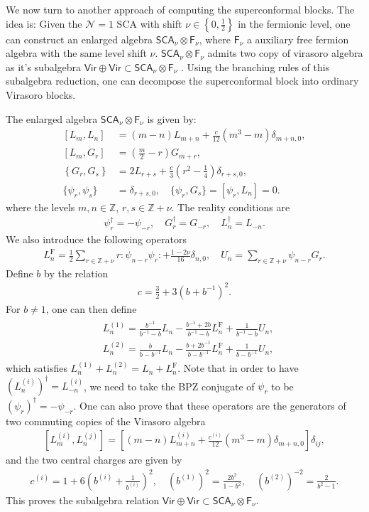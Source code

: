 \documentclass[12pt]{article}
\newcommand{\ie}{\begin{equation}\begin{aligned}}
\newcommand{\fe}{\end{aligned}\end{equation}}
\numberwithin{equation}{section}
\begin{document}
We now turn to another approach of computing the superconformal blocks. The idea is: Given the $\mathcal{N}=1$ SCA with shift $\nu\in \left\{0,\frac{1}{2}\right\}$ in the fermionic level, one can construct an enlarged algebra $\mathsf{SCA}_\nu \otimes \mathsf{F}_{\nu}$, where $\mathsf{F}_{\nu}$ a auxiliary free fermion algebra with the same level shift $\nu$.  $\mathsf{SCA}_\nu \otimes \mathsf{F}_{\nu}$ admits two copy of virasoro algebra as it's subalgebra $\mathsf{Vir}\oplus \mathsf{Vir}\subset \mathsf{SCA}_\nu \otimes \mathsf{F}_{\nu}$ \cite{1312.4520,1608.02568}. Using the branching rules of this subalgebra reduction, one can decompose the superconformal block into ordinary Virasoro blocks.

The enlarged algebra $\mathsf{SCA}_\nu \otimes \mathsf{F}_{\nu}$ is given by:
\ie
{\left[L_m, L_n\right] } & =(m-n) L_{m+n}+\frac{c}{12}\left(m^3-m\right) \delta_{m+n, 0}, \\
{\left[L_m, G_r\right] } & =\left(\frac{m}{2}-r\right) G_{m+r}, \\
\left\{G_r, G_s\right\} & =2 L_{r+s}+\frac{c}{3}\left(r^2-\frac{1}{4}\right) \delta_{r+s, 0} ,\\
\{\psi_r, \psi_s\} &= \delta_{r+s,0},\quad \{\psi_r, G_s\}=[\psi_r, L_n] = 0.
\fe
where the levels $m,n\in\mathbb{Z}$, $r, s\in \mathbb{Z}+\nu$. The reality conditions are
\ie
\psi_{r}^\dagger = -\psi_{-r}, \quad G_{r}^\dagger = G_{-r}, \quad L_{n}^\dagger = L_{-n}.
\fe
We also introduce the following operators
\ie
L_n^{\mathrm{F}} = \frac{1}{2} \sum_{r\in \mathbb{Z}+\nu} r:\psi_{n-r}\psi_r: + \frac{1-2\nu}{16}\delta_{n,0},\quad U_n = \sum_{r\in \mathbb{Z}+\nu} \psi_{n-r} G_r.
\fe
Define $b$ by the relation
\ie
c= \frac{3}{2}+3\left(b+b^{-1}\right)^2.
\fe
For $b\neq 1$, one can then define
\ie
\begin{aligned}
& L_n^{(1)}=\frac{b^{-1}}{b^{-1}-b} L_n-\frac{b^{-1}+2 b}{b^{-1}-b} L_n^{\mathrm{F}}+\frac{1}{b^{-1}-b} U_n, \\
& L_n^{(2)}=\frac{b}{b-b^{-1}} L_n-\frac{b+2 b^{-1}}{b-b^{-1}} L_n^{\mathrm{F}}+\frac{1}{b-b^{-1}} U_n ,
\end{aligned}
\fe
which satisfies $L_n^{(1)}+L_n^{(2)}=L_n+L_n^{\mathrm{F}}$. Note that in order to have $(L_n^{(i)})^\dagger = L_{-n}^{(i)}$, we need to take the BPZ conjugate of $\psi_r$ to be $(\psi_r)^\dagger = -\psi_{-r}$. One can also prove that these operators are the generators of two commuting copies of the Virasoro algebra
\ie
[L_m^{(i)}, L_n^{(j)}] = \left[(m-n) L_{m+n}^{(i)} + \frac{c^{(i)}}{12} (m^3-m)\delta_{m+n,0}\right]\delta_{ij},
\fe
and the two central charges are given by
\ie
c^{(i)}=1+6\left(b^{(i)}+\frac{1}{b^{(i)}}\right)^2,\quad (b^{(1)})^2 = \frac{2b^2}{1-b^2},\quad (b^{(2)})^{-2} = \frac{2}{b^2-1}.
\fe
This proves the subalgebra relation $\mathsf{Vir}\oplus \mathsf{Vir}\subset \mathsf{SCA}_\nu \otimes \mathsf{F}_{\nu}$. 
\end{document}
